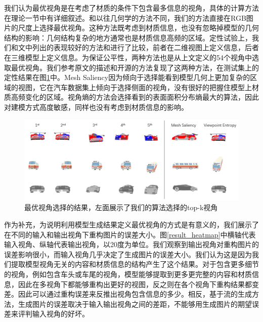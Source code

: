\documentclass[UTF8,openany,AutoFakeBold,AutoFakeSlant,cs4size]{ctexbook}
\begin{document}
我们认为最优视角是在考虑了材质的条件下包含最多信息的视角，具体的计算方法在理论一节中有详细叙述。和以往几何学的方法不同，我们的方法直接在RGB图片的尺度上选择最优视角。这种方法既考虑到材质信息，也没有忽略掉模型的几何结构的影响：几何结构复杂的地方通常也是材质信息高频的区域。定性试验上，我们和\cite{Dutagaci2010ABF}文中列出的表现较好的方法\cite{Vzquez2003AutomaticVS}和\cite{Lee2005MeshS}进行了比较，前者在二维视图上定义信息，后者在三维模型上定义信息。为保证公平性，两种方法也是从上文定义的54个视角中选取最优视角。我们参考原文的描述和开源的方法复现了这两种方法，在测试集上的定性结果在图\ref{result_bestview}中。Mesh Saliency\cite{Lee2005MeshS}因为倾向于选择能看到模型几何上更加复杂的区域的视图，它在汽车数据集上倾向于选择侧面的视角，没有很好的把握住模型上材质高频变化的区域。视角熵\cite{Vzquez2003AutomaticVS}的方法会选择看到的表面面积分布熵最大的算法，因此对建模方式高度敏感，同样也没有考虑到材质信息的影响。

\begin{figure}
\centering
\includegraphics[width=\linewidth]{./images/best_viewpoint_thesis.png}
\caption{最优视角选择的结果，左面展示了我们的算法选择的top-k视角}
\label{result_bestview}
\end{figure}


作为补充，为说明利用模型生成结果定义最优视角的方式是有意义的，我们展示了在不同的输入和输出视角下重构图片的误差大小。图\ref{result_heatmap}中横轴代表输入视角、纵轴代表输出视角，以20度为单位。我们观察到输出视角对重构图片的误差影响很小，而输入视角几乎决定了生成图片的误差大小。我们认为这是因为我们提取模型视角无关的内容和材质信息的结构产生了这个结果。对于包含更多细节的视角，例如包含车头或车尾的视角，模型能够提取到更多更完整的内容和材质信息，因此在多视角下都能够重构出更好的视图，反之则在各个视角下重构结果都变差。因此可以通过重构误差来反推出视角包含信息的多少。相反，基于流的生成方法，生成图片的误差取决于输入输出视角之间的差距，不能够用生成图片的期望误差来评判输入视角的好坏。
\end{document}
